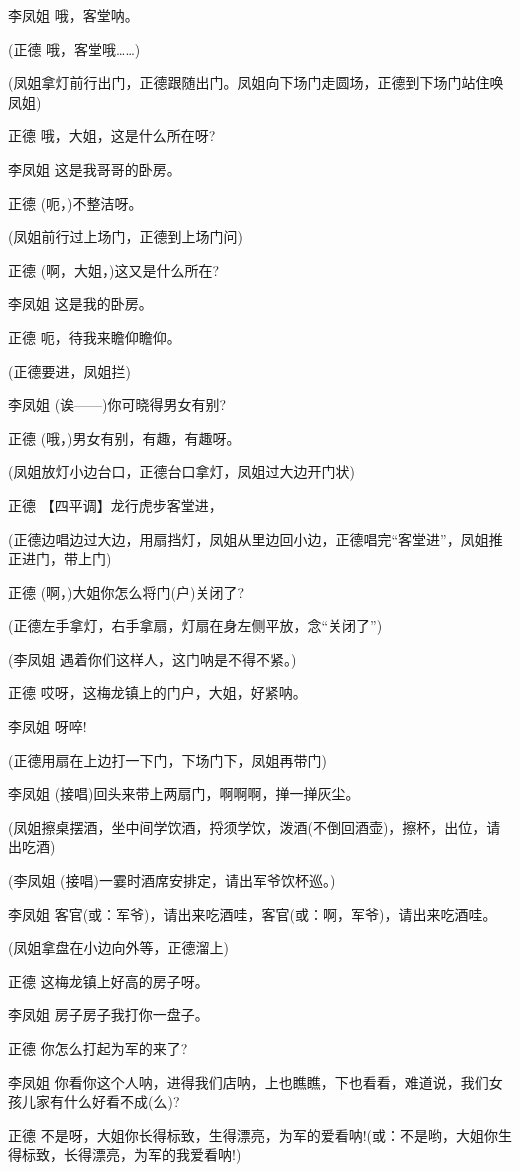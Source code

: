李凤姐 哦，客堂呐。

(正德 哦，客堂哦\ldots{}\ldots{})

(凤姐拿灯前行出门，正德跟随出门。凤姐向下场门走圆场，正德到下场门站住唤凤姐)

正德 哦，大姐，这是什么所在呀?

李凤姐 这是我哥哥的卧房。

正德 (呃，)不整洁呀。

(凤姐前行过上场门，正德到上场门问)

正德 (啊，大姐，)这又是什么所在?

李凤姐 这是我的卧房。

正德 呃，待我来瞻仰瞻仰。

(正德要进，凤姐拦)

李凤姐 (诶------)你可晓得男女有别?

正德 (哦，)男女有别，有趣，有趣呀。

(凤姐放灯小边台口，正德台口拿灯，凤姐过大边开门状)

正德 【四平调】龙行虎步客堂进，

(正德边唱边过大边，用扇挡灯，凤姐从里边回小边，正德唱完``客堂进''，凤姐推正进门，带上门)

正德 (啊，)大姐你怎么将门(户)关闭了?

(正德左手拿灯，右手拿扇，灯扇在身左侧平放，念``关闭了'')

(李凤姐 遇着你们这样人，这门呐是不得不紧。)

正德 哎呀，这梅龙镇上的门户，大姐，好紧呐。

李凤姐 呀啐!

(正德用扇在上边打一下门，下场门下，凤姐再带门)

李凤姐 (接唱)回头来带上两扇门，啊啊啊，掸一掸灰尘。

(凤姐擦桌摆酒，坐中间学饮酒，捋须学饮，泼酒(不倒回酒壶)，擦杯，出位，请出吃酒)

(李凤姐 (接唱)一霎时酒席安排定，请出军爷饮杯巡。)

李凤姐 客官(或：军爷)，请出来吃酒哇，客官(或：啊，军爷)，请出来吃酒哇。

(凤姐拿盘在小边向外等，正德溜上)

正德 这梅龙镇上好高的房子呀。

李凤姐 房子房子我打你一盘子。

正德 你怎么打起为军的来了?

李凤姐
你看你这个人呐，进得我们店呐，上也瞧瞧，下也看看，难道说，我们女孩儿家有什么好看不成(么)?

正德
不是呀，大姐你长得标致，生得漂亮，为军的爱看呐!(或：不是哟，大姐你生得标致，长得漂亮，为军的我爱看呐!)

